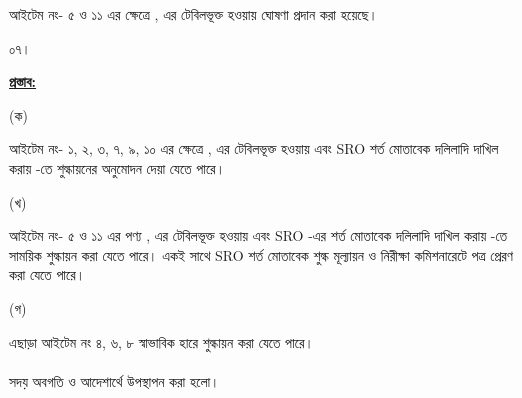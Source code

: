 \documentclass[12pt]{article}
\begin{document}
\begin{minipage}[t]{0.95\linewidth}
আইটেম নং-  ৫ ও ১১ এর ক্ষেত্রে
{\srooot}, {\sroootd}
এর টেবিলভূক্ত হওয়ায়
{\cpcofs}
ঘোষণা প্রদান করা হয়েছে।
\\
\end{minipage}
\begin{minipage}[t]{0.05\linewidth}
০৭।
\end{minipage}
\begin{minipage}[t]{0.95\linewidth}
\underline{\textbf{প্রস্তাব:}}
\end{minipage}
\begin{minipage}[t]{0.05\linewidth}
\hspace{1em}
\end{minipage}
\begin{minipage}[t]{0.05\linewidth}
(ক)
\end{minipage}
\begin{minipage}[t]{0.90\linewidth}
আইটেম নং- ১, ২, ৩, ৭, ৯, ১০
এর ক্ষেত্রে
{\srooot}, {\sroootd}
এর টেবিলভূক্ত হওয়ায়
এবং SRO শর্ত মোতাবেক দলিলাদি দাখিল করায়
{\cpctto} -তে শুল্কায়নের অনুমোদন দেয়া যেতে পারে।
\\
\end{minipage}
\begin{minipage}[t]{0.05\linewidth}
\hspace{1em}
\end{minipage}
\begin{minipage}[t]{0.05\linewidth}
(খ)
\end{minipage}
\begin{minipage}[t]{0.90\linewidth}
আইটেম নং-  ৫ ও ১১ এর পণ্য
{\srooot}, {\sroootd}
এর টেবিলভূক্ত হওয়ায়
এবং SRO -এর শর্ত মোতাবেক
দলিলাদি দাখিল করায়
{\cpcofs} -তে সাময়িক শুল্কায়ন
করা যেতে পারে।
একই সাথে SRO শর্ত মোতাবেক
শুল্ক মূল্যায়ন ও নিরীক্ষা কমিশনারেটে
পত্র প্রেরণ করা যেতে পারে।
\\
\end{minipage}
\begin{minipage}[t]{0.05\linewidth}
\hspace{1em}
\end{minipage}
\begin{minipage}[t]{0.05\linewidth}
(গ)
\end{minipage}
\begin{minipage}[t]{0.90\linewidth}
এছাড়া আইটেম নং ৪, ৬, ৮ স্বাভাবিক হারে শুল্কায়ন
করা যেতে পারে।
\\
\\
\normalsize
সদয় অবগতি ও আদেশার্থে উপস্থাপন করা
হলো।
\end{minipage}
\end{document}
